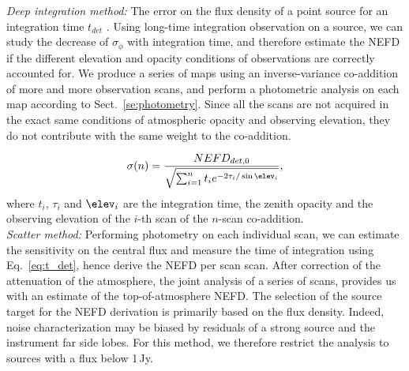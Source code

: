 \noindent \emph{Deep integration method:} The error on the flux density of a
point source for an integration time $t_{det}$ . Using long-time integration observation on a source,
we can study the decrease of $\sigma_\phi$ with integration time, and
therefore estimate the NEFD if the different elevation and opacity conditions of
observations are correctly accounted for.  We produce a series of maps using an
inverse-variance co-addition of more and more observation scans, and perform a
photometric analysis on each map according to Sect.~\ref{se:photometry}. Since
all the scans are not acquired in the exact same conditions of atmospheric
opacity and observing elevation, they do not contribute with the same weight to
the co-addition. 

\begin{equation}
  \sigma(n) = \frac{NEFD_{det,0}}{\sqrt{\sum_{i=1}^{n}t_i e^{-2\tau_i/\sin\elev_i}}},
  \label{eq:sigma_tau_w8}
\end{equation}
where $t_i$, $\tau_i$ and $\elev_i$ are the integration time, the zenith
opacity and the observing elevation of the $i$-th scan of the $n$-scan
co-addition. \\

\noindent \emph{Scatter method:} Performing photometry on each individual scan,
we can estimate the sensitivity on the central flux and measure the time of
integration using Eq.~\ref{eq:t_det}, hence derive the NEFD per scan
scan. After correction of the attenuation of the atmosphere, the joint analysis
of a series of scans,  provides us with
an estimate of the top-of-atmosphere NEFD. The selection of the source target
for the NEFD derivation is primarily based on the flux density. Indeed, noise
characterization may be biased by residuals of a strong source and the
instrument far side lobes. For this method, we therefore restrict the
analysis to sources with a flux below 1\,Jy.

